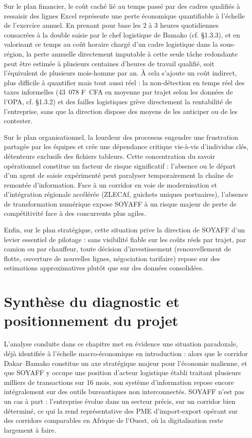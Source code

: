 Sur le plan financier, le coût caché lié au temps passé par des cadres qualifiés à ressaisir des lignes Excel représente une perte économique quantifiable à l'échelle de l'exercice annuel. En prenant pour base les 2 à 3 heures quotidiennes consacrées à la double saisie par le chef logistique de Bamako (cf. §1.3.3), et en valorisant ce temps au coût horaire chargé d'un cadre logistique dans la sous-région, la perte annuelle directement imputable à cette seule tâche redondante peut être estimée à plusieurs centaines d'heures de travail qualifié, soit l'équivalent de plusieurs mois-homme par an. À cela s'ajoute un coût indirect, plus difficile à quantifier mais tout aussi réel : la non-détection en temps réel des taxes informelles (43~078 F~CFA en moyenne par trajet selon les données de l'OPA, cf. §1.3.2) et des failles logistiques grève directement la rentabilité de l'entreprise, sans que la direction dispose des moyens de les anticiper ou de les contester.

Sur le plan organisationnel, la lourdeur des processus engendre une frustration partagée par les équipes et crée une dépendance critique vis-à-vis d'individus clés, détenteurs exclusifs des fichiers tableurs. Cette concentration du savoir opérationnel constitue un facteur de risque significatif : l'absence ou le départ d'un agent de saisie expérimenté peut paralyser temporairement la chaîne de remontée d'information. Face à un corridor en voie de modernisation et d'intégration régionale accélérée (ZLECAf, guichets uniques portuaires), l'absence de transformation numérique expose SOYAFF à un risque majeur de perte de compétitivité face à des concurrents plus agiles.

Enfin, sur le plan stratégique, cette situation prive la direction de SOYAFF d'un levier essentiel de pilotage : sans visibilité fiable sur les coûts réels par trajet, par camion ou par chauffeur, toute décision d'investissement (renouvellement de flotte, ouverture de nouvelles lignes, négociation tarifaire) repose sur des estimations approximatives plutôt que sur des données consolidées.

\section{Synthèse du diagnostic et positionnement du projet}
\label{sec:synthese_diagnostic}

L'analyse conduite dans ce chapitre met en évidence une situation paradoxale, déjà identifiée à l'échelle macro-économique en introduction : alors que le corridor Dakar--Bamako constitue un axe stratégique majeur pour l'économie malienne, et que SOYAFF y occupe une position d'acteur logistique établi traitant plusieurs milliers de transactions sur 16 mois, son système d'information repose encore intégralement sur des outils bureautiques non interconnectés. SOYAFF n'est pas un cas à part : l'entreprise évolue dans un secteur précis, sur un corridor bien déterminé, ce qui la rend représentative des PME d'import-export opérant sur des corridors comparables en Afrique de l'Ouest, où la digitalisation reste largement à faire.


